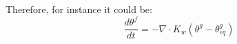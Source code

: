 Therefore, for instance it could be:
\begin{equation}
\frac{d \theta^f}{dt} = - {\nabla}\cdot K_w ({\theta^g - \theta^g_{eq}})
\end{equation}
